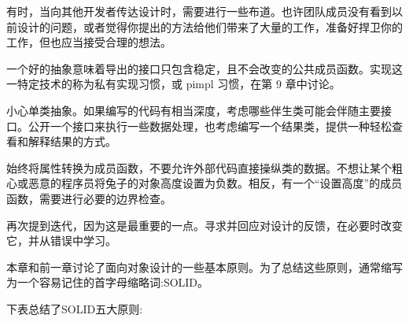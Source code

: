 有时，当向其他开发者传达设计时，需要进行一些布道。也许团队成员没有看到以前设计的问题，或者觉得你提出的方法给他们带来了大量的工作，准备好捍卫你的工作，但也应当接受合理的想法。

一个好的抽象意味着导出的接口只包含稳定，且不会改变的公共成员函数。实现这一特定技术的称为私有实现习惯，或 pimpl 习惯，在第 9 章中讨论。

小心单类抽象。如果编写的代码有相当深度，考虑哪些伴生类可能会伴随主要接口。公开一个接口来执行一些数据处理，也考虑编写一个结果类，提供一种轻松查看和解释结果的方式。

始终将属性转换为成员函数，不要允许外部代码直接操纵类的数据。不想让某个粗心或恶意的程序员将兔子的对象高度设置为负数。相反，有一个“设置高度”的成员函数，需要进行必要的边界检查。

再次提到迭代，因为这是最重要的一点。寻求并回应对设计的反馈，在必要时改变它，并从错误中学习。


本章和前一章讨论了面向对象设计的一些基本原则。为了总结这些原则，通常缩写为一个容易记住的首字母缩略词:SOLID。

下表总结了SOLID五大原则:

